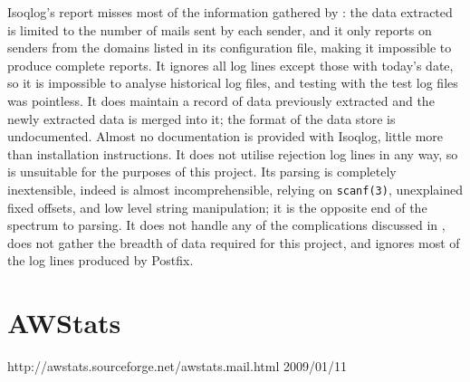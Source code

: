 Isoqlog's report misses most of the information gathered by \parsername{}:
the data extracted is limited to the number of mails sent by each sender,
and it only reports on senders from the domains listed in its configuration
file, making it impossible to produce complete reports.  It ignores all log
lines except those with today's date, so it is impossible to analyse
historical log files, and testing with the \numberOFlogFILES{} test log
files was pointless.  It does maintain a record of data previously
extracted and the newly extracted data is merged into it; the format of the
data store is undocumented.  Almost no documentation is provided with
Isoqlog, little more than installation instructions.  It does not utilise
rejection log lines in any way, so is unsuitable for the purposes of this
project.  Its parsing is completely inextensible, indeed is almost
incomprehensible, relying on \texttt{scanf(3)}, unexplained fixed offsets,
and low level string manipulation; it is the opposite end of the spectrum
to \parsernames{} parsing.  It does not handle any of the complications
discussed in , does not gather the breadth of
data required for this project, and ignores most of the log lines produced
by Postfix.

\section{AWStats}

{http://awstats.sourceforge.net/awstats.mail.html}
{2009/01/11}

